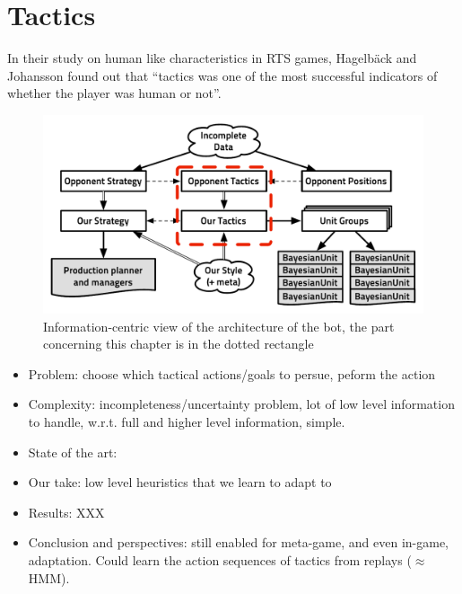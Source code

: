 \chapter{Tactics}
In their study on human like characteristics in RTS games, Hagelb\"{a}ck and Johansson \cite{HagelbackCIG10} found out that ``tactics was one of the most successful indicators of whether the player was human or not''. 

\begin{figure}[!ht]
\begin{center}
\includegraphics[width=13cm]{images/starcraft_bbq_concept_TACTICS.pdf}
\end{center}
\label{fig:conceptTACTICS}
\caption{Information-centric view of the architecture of the bot, the part concerning this chapter is in the dotted rectangle}
\end{figure}
\begin{itemize}
\item Problem: choose which tactical actions/goals to persue, peform the action
\item Complexity: incompleteness/uncertainty problem, lot of low level information to handle, w.r.t. full and higher level information, simple.
\item State of the art: \citep{SORTS, Weber2010cr, UCT, CadenaG11}
\item Our take: low level heuristics that we learn to adapt to
\item Results: XXX
\item Conclusion and perspectives: still enabled for meta-game, and even in-game, adaptation. Could learn the action sequences of tactics from replays ($\approx$HMM).
\end{itemize}

